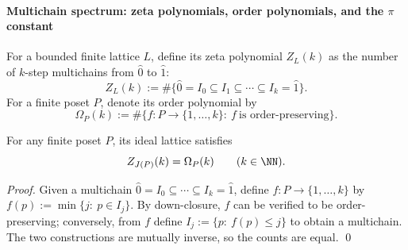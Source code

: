 \paragraph{Multichain spectrum: zeta polynomials, order polynomials, and the \texorpdfstring{\(\pi\)}{pi} constant}
\begin{definition}\label{def:pom-zeta-order-polynomial}
For a bounded finite lattice \(L\), define its zeta polynomial \(Z_L(k)\) as the number of \(k\)-step multichains from \(\hat0\) to \(\hat1\):
\[
Z_L(k):=\#\{\hat0=I_0\subseteq I_1\subseteq \cdots \subseteq I_k=\hat1\}.
\]
For a finite poset \(P\), denote its order polynomial by
\[
\Omega_P(k):=\#\{f:P\to\{1,\dots,k\}:\ f \ \text{is order-preserving}\}.
\]
\end{definition}

\begin{theorem}\label{thm:pom-zeta-equals-order-poly}
For any finite poset \(P\), its ideal lattice satisfies
\[
Z_{J(P)}(k)=\Omega_P(k)\qquad(k\in\NN).
\]
\end{theorem}
\begin{proof}
Given a multichain \(\hat0=I_0\subseteq\cdots\subseteq I_k=\hat1\), define \(f:P\to\{1,\dots,k\}\) by
\(
f(p):=\min\{j:\ p\in I_j\}
\).
By down-closure, \(f\) can be verified to be order-preserving; conversely, from \(f\) define \(I_j:=\{p:\ f(p)\le j\}\) to obtain a multichain.
The two constructions are mutually inverse, so the counts are equal. \qed
\end{proof}


